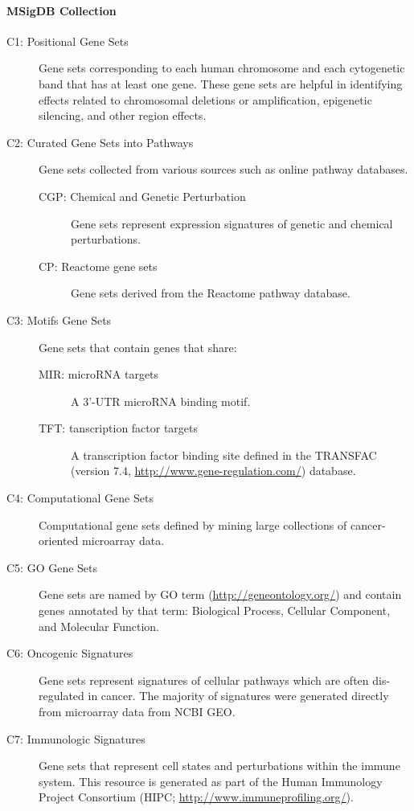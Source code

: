 \documentclass[a4paper]{article}
\begin{document}
\paragraph{MSigDB Collection}
\begin{description}
\item[C1: Positional Gene Sets] Gene sets corresponding to each human chromosome and each cytogenetic band that has at least one gene. These gene sets are helpful in identifying effects related to chromosomal deletions or amplification, epigenetic silencing, and other region effects.
\item[C2: Curated Gene Sets into Pathways] Gene sets collected from various sources such as online pathway databases.
\begin{description}
\item[CGP: Chemical and Genetic Perturbation] Gene sets represent expression signatures of genetic and chemical perturbations. 
\item[CP: Reactome gene sets] Gene sets derived from the Reactome pathway database.
\end{description}
\item[C3: Motifs Gene Sets] Gene sets that contain genes that share:
\begin{description}
\item [MIR: microRNA targets] A 3'-UTR microRNA binding motif.
\item [TFT: tanscription factor targets] A transcription factor binding site defined in the TRANSFAC (version 7.4, \url{http://www.gene-regulation.com/}) database. 
\end{description}
\item[C4: Computational Gene Sets] Computational gene sets defined by mining large collections of cancer-oriented microarray data. 

\item[C5: GO Gene Sets] Gene sets are named by GO term (\url{http://geneontology.org/}) and contain genes annotated by that term: Biological Process, Cellular Component, and Molecular Function.
\item[C6: Oncogenic Signatures] Gene sets represent signatures of cellular pathways which are often dis-regulated in cancer. The majority of signatures were generated directly from microarray data from NCBI GEO.
\item[C7: Immunologic Signatures] Gene sets that represent cell states and perturbations within the immune system. This resource is generated as part of the Human Immunology Project Consortium (HIPC; \url{http://www.immuneprofiling.org/}). 


\end{description}
\end{document}
